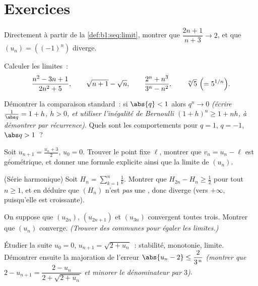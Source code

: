 \section{Exercices}

\begin{exercise}[$\star$]\label{exo:b1:seq:1}
Directement à partir de la \cref{def:b1:seq:limit}, montrer que
$\dfrac{2n+1}{n+3} \to 2$, et que $(u_n) = ((-1)^n)$ diverge.
\end{exercise}

\begin{exercise}[$\star$]\label{exo:b1:seq:2}
Calculer les limites~:
\[
\frac{n^2 - 3n + 1}{2n^2 + 5},
\qquad
\sqrt{n+1} - \sqrt n,
\qquad
\frac{2^n + n^3}{3^n - n^2},
\qquad
\sqrt[n]{5}\ \Bigl(= 5^{1/n}\Bigr).
\]
\end{exercise}

\begin{exercise}[$\star$]\label{exo:b1:seq:3}
Démontrer la comparaison standard~: si $\abs{q} < 1$ alors $q^n \to 0$
\emph{(écrire $\frac{1}{\abs q} = 1 + h$, $h > 0$, et utiliser
l'inégalité de Bernoulli $(1+h)^n \geq 1 + nh$, à démontrer par
récurrence)}. Quels sont les comportements pour $q = 1$, $q = -1$,
$\abs q > 1$~?
\end{exercise}

\begin{exercise}[$\star$]\label{exo:b1:seq:4}
Soit $u_{n+1} = \frac{u_n + 3}{2}$, $u_0 = 0$. Trouver le point fixe
$\ell$, montrer que $v_n = u_n - \ell$ est géométrique, et donner une
formule explicite ainsi que la limite de $(u_n)$.
\end{exercise}

\begin{exercise}[$\star\star$]\label{exo:b1:seq:5}
(Série harmonique) Soit $H_n = \sum_{k=1}^{n} \frac 1k$. Montrer que
$H_{2n} - H_n \geq \frac12$ pour tout $n \geq 1$, et en déduire que
$(H_n)$ n'est \emph{pas} une , donc diverge (vers
$+\infty$, puisqu'elle est croissante).
\end{exercise}

\begin{exercise}[$\star\star$]\label{exo:b1:seq:6}
On suppose que $(u_{2n})$, $(u_{2n+1})$ et $(u_{3n})$ convergent
toutes trois. Montrer que $(u_n)$ converge. \emph{(Trouver des  communes pour égaler les limites.)}
\end{exercise}

\begin{exercise}[$\star\star$]\label{exo:b1:seq:7}
Étudier la suite $u_0 = 0$, $u_{n+1} = \sqrt{2 + u_n}$~: stabilité,
monotonie, limite. Démontrer ensuite la majoration de l'erreur
$\abs{u_n - 2} \leq \dfrac{2}{3^{\,n}}$ \emph{(montrer que $2 -
u_{n+1} = \dfrac{2 - u_n}{2 + \sqrt{2 + u_n}}$ et minorer le
dénominateur par $3$)}.
\end{exercise}


